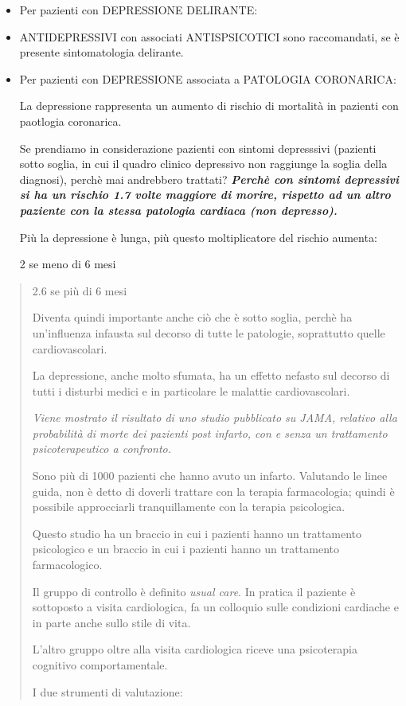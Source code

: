 \documentclass[]{article}
\begin{document}
\begin{itemize}
\item
  Per pazienti con DEPRESSIONE DELIRANTE:
\end{itemize}

\begin{itemize}
\item
  ANTIDEPRESSIVI con associati ANTISPSICOTICI sono raccomandati, se è
  presente sintomatologia delirante.
\end{itemize}

\begin{itemize}
\item
  Per pazienti con DEPRESSIONE associata a PATOLOGIA CORONARICA:

  La depressione rappresenta un aumento di rischio di mortalità in
  pazienti con paotlogia coronarica.

  Se prendiamo in considerazione pazienti con sintomi depresssivi
  (pazienti sotto soglia, in cui il quadro clinico depressivo non
  raggiunge la soglia della diagnosi), perchè mai andrebbero trattati?
  \textbf{\emph{Perchè con sintomi depressivi si ha un rischio 1.7 volte
  maggiore di morire, rispetto ad un altro paziente con la stessa
  patologia cardiaca (non depresso).}}

  Più la depressione è lunga, più questo moltiplicatore del rischio
  aumenta:

  2 se meno di 6 mesi
\end{itemize}

\begin{quote}
2.6 se più di 6 mesi

Diventa quindi importante anche ciò che è sotto soglia, perchè ha
un'influenza infausta sul decorso di tutte le patologie, soprattutto
quelle cardiovascolari.

La depressione, anche molto sfumata, ha un effetto nefasto sul decorso
di tutti i disturbi medici e in particolare le malattie cardiovascolari.

\emph{Viene mostrato il risultato di uno studio pubblicato su JAMA,
relativo alla probabilità di morte dei pazienti post infarto, con e
senza un trattamento psicoterapeutico a confronto.}

Sono più di 1000 pazienti che hanno avuto un infarto. Valutando le linee
guida, non è detto di doverli trattare con la terapia farmacologia;
quindi è possibile approcciarli tranquillamente con la terapia
psicologica.

Questo studio ha un braccio in cui i pazienti hanno un trattamento
psicologico e un braccio in cui i pazienti hanno un trattamento
farmacologico.

Il gruppo di controllo è definito \emph{usual care}. In pratica il
paziente è sottoposto a visita cardiologica, fa un colloquio sulle
condizioni cardiache e in parte anche sullo stile di vita.

L'altro gruppo oltre alla visita cardiologica riceve una psicoterapia
cognitivo comportamentale.

I due strumenti di valutazione:
\end{quote}
\end{document}
